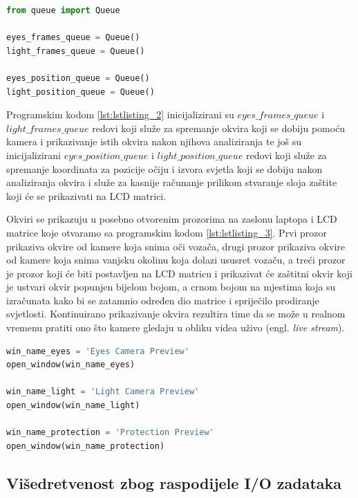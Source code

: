 \documentclass{foi}
\begin{document}
\begin{lstlisting}[language=Python, label={lst:lstlisting_2}, firstnumber=4, style=colored, caption=Uključivanje biblioteke $queue$ i inicijaliziranje redova]
from queue import Queue

eyes_frames_queue = Queue()
light_frames_queue = Queue()

eyes_position_queue = Queue()
light_position_queue = Queue()
\end{lstlisting}

Programskim kodom \ref{lst:lstlisting_2} inicijalizirani su  $eyes\_frames\_queue$ i $light\_frames\_queue$ redovi koji služe za spremanje okvira koji se dobiju pomoću kamera i prikazivanje istih okvira nakon njihova analiziranja te još su inicijalizirani $eyes\_position\_queue$ i $light\_position\_queue$ redovi koji služe za spremanje koordinata za pozicije očiju i izvora svjetla koji se dobiju nakon analiziranja okvira i služe za kasnije računanje prilikom stvaranje sloja zaštite koji će se prikazivati na LCD matrici.

Okviri se prikazuju u posebno otvorenim prozorima na zaslonu laptopa i LCD matrice koje otvaramo sa programskim kodom \ref{lst:lstlisting_3}. Prvi prozor prikaziva okvire od kamere koja snima oči vozača, drugi prozor prikaziva okvire od kamere koja snima vanjsku okolinu koja dolazi ususret vozaču, a treći prozor je prozor koji će biti postavljen na LCD matricu i prikazivat će zaštitni okvir koji je ustvari okvir popunjen bijelom bojom, a crnom bojom na mjestima koja su izračunata kako bi se zatamnio određen dio matrice i spriječilo prodiranje svjetlosti. Kontinuirano prikazivanje okvira rezultira time da se može u realnom vremenu pratiti ono što kamere gledaju u obliku videa uživo (engl. \emph{live stream}).

\begin{lstlisting}[language=Python, label={lst:lstlisting_3}, firstnumber=142, style=colored, caption=Otvaranje prozora na zaslonu]
win_name_eyes = 'Eyes Camera Preview'
open_window(win_name_eyes)

win_name_light = 'Light Camera Preview'
open_window(win_name_light)

win_name_protection = 'Protection Preview'
open_window(win_name_protection)
\end{lstlisting}

\subsection{Višedretvenost zbog raspodijele I/O zadataka}
\end{document}
